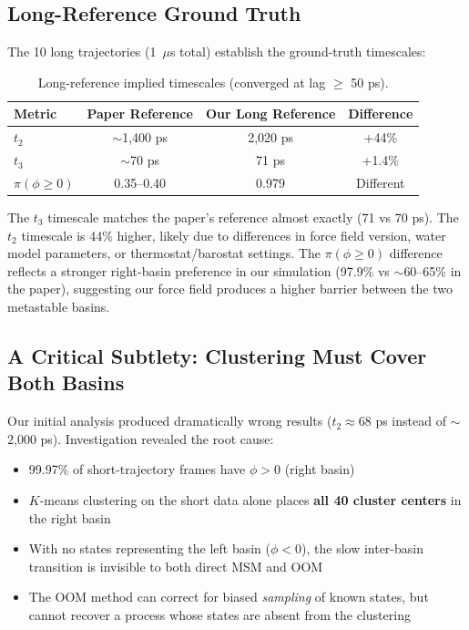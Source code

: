 \documentclass[11pt,a4paper]{article}
\begin{document}
\subsection{Long-Reference Ground Truth}

The 10 long trajectories (1~$\mu$s total) establish the ground-truth timescales:

\begin{table}[H]
\centering
\caption{Long-reference implied timescales (converged at lag $\geq$ 50 ps).}
\begin{tabular}{lccc}
\toprule
Metric & Paper Reference & Our Long Reference & Difference \\
\midrule
$t_2$ & $\sim$1{,}400 ps & 2{,}020 ps & +44\% \\
$t_3$ & $\sim$70 ps & 71 ps & +1.4\% \\
$\pi(\phi \geq 0)$ & 0.35--0.40 & 0.979 & Different \\
\bottomrule
\end{tabular}
\end{table}

The $t_3$ timescale matches the paper's reference almost exactly (71 vs 70 ps). The $t_2$ timescale is 44\% higher, likely due to differences in force field version, water model parameters, or thermostat/barostat settings. The $\pi(\phi \geq 0)$ difference reflects a stronger right-basin preference in our simulation (97.9\% vs $\sim$60--65\% in the paper), suggesting our force field produces a higher barrier between the two metastable basins.

\subsection{A Critical Subtlety: Clustering Must Cover Both Basins}
\label{sec:clustering}

Our initial analysis produced dramatically wrong results ($t_2 \approx 68$ ps instead of $\sim$2{,}000 ps). Investigation revealed the root cause:

\begin{itemize}[nosep]
    \item 99.97\% of short-trajectory frames have $\phi > 0$ (right basin)
    \item $K$-means clustering on the short data alone places \textbf{all 40 cluster centers} in the right basin
    \item With no states representing the left basin ($\phi < 0$), the slow inter-basin transition is invisible to both direct MSM and OOM
    \item The OOM method can correct for biased \textit{sampling} of known states, but cannot recover a process whose states are absent from the clustering
\end{itemize}
\end{document}
